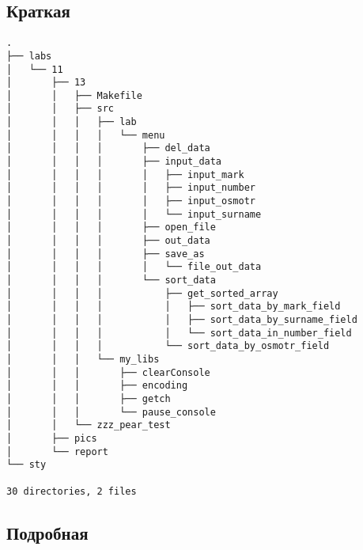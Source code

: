 \subsection{Краткая}

\begin{verbatim}
.
├── labs
│   └── 11
│       ├── 13
│       │   ├── Makefile
│       │   ├── src
│       │   │   ├── lab
│       │   │   │   └── menu
│       │   │   │       ├── del_data
│       │   │   │       ├── input_data
│       │   │   │       │   ├── input_mark
│       │   │   │       │   ├── input_number
│       │   │   │       │   ├── input_osmotr
│       │   │   │       │   └── input_surname
│       │   │   │       ├── open_file
│       │   │   │       ├── out_data
│       │   │   │       ├── save_as
│       │   │   │       │   └── file_out_data
│       │   │   │       └── sort_data
│       │   │   │           ├── get_sorted_array
│       │   │   │           │   ├── sort_data_by_mark_field
│       │   │   │           │   ├── sort_data_by_surname_field
│       │   │   │           │   └── sort_data_in_number_field
│       │   │   │           └── sort_data_by_osmotr_field
│       │   │   └── my_libs
│       │   │       ├── clearConsole
│       │   │       ├── encoding
│       │   │       ├── getch
│       │   │       └── pause_console
│       │   └── zzz_pear_test
│       ├── pics
│       └── report
└── sty

30 directories, 2 files
\end{verbatim}

\subsection{Подробная}

